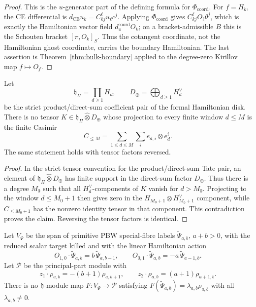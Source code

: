 \begin{proof}
  This is the \(u\)-generator part of the defining formula for
  \(\Phi_{\mathrm{coord}}\).
  For \(f=H_k\), the CE differential is
  \(d_{\mathrm{CE}}u_k=C^\ell_{kj}u_\ell c^j\).  Applying
  \(\Phi_{\mathrm{coord}}\) gives
  \(C^\ell_{kj}O_\ell\theta^j\), which is exactly the Hamiltonian vector
	  field \(d_\pi^{\mathrm{coord}}O_k\); on a bracket-admissible \(B\) this
	  is the Schouten bracket \([\pi,O_k]_S\).  Thus the cotangent coordinate, not the
  Hamiltonian ghost coordinate, carries the boundary Hamiltonian.  The
  last assertion is Theorem~\ref{thm:bulk-boundary} applied to the
  degree-zero Kirillov map \(f\mapsto O_f\).
\end{proof}

\begin{thm}\label{thm:lane-strict-casimir-obstruction}
  Let
  \[
    \mathfrak h_\Pi=\prod_{d\geq1}H_d,\qquad
    D_\oplus=\bigoplus_{d\geq1}H_d^\vee
  \]
  be the strict product/direct-sum coefficient pair of the formal
  Hamiltonian disk.  There is no tensor
  \(K\in\mathfrak h_\Pi\widehat\otimes D_\oplus\) whose projection to
  every finite window \(d\leq M\) is the finite Casimir
  \[
    C_{\leq M}=\sum_{1\leq d\leq M}\sum_i e_{d,i}\otimes e^i_{d}.
  \]
  The same statement holds with tensor factors reversed.
\end{thm}

\begin{proof}
  In the strict tensor convention for the product/direct-sum Tate pair,
  an element of \(\mathfrak h_\Pi\widehat\otimes D_\oplus\) has finite
  support in the direct-sum factor \(D_\oplus\).  Thus there is a degree
  \(M_0\) such that all \(H_d^\vee\)-components of \(K\) vanish for
  \(d>M_0\).  Projecting to the window \(d\leq M_0+1\) then gives zero in
  the \(H_{M_0+1}\otimes H_{M_0+1}^\vee\) component, while
  \(C_{\leq M_0+1}\) has the nonzero identity tensor in that component.
  This contradiction proves the claim.  Reversing the tensor factors is
  identical.
\end{proof}

\begin{thm}\label{thm:lane-one-psi-not-cotangent-current}
  Let \(V_\Psi\) be the span of primitive PBW special-fibre labels
  \(\widetilde\Psi_{a,b}\), \(a+b>0\), with the reduced scalar target
  killed and with the linear Hamiltonian action
  \[
    O_{1,0}\cdot\widetilde\Psi_{a,b}
      =b\,\widetilde\Psi_{a,b-1},\qquad
    O_{0,1}\cdot\widetilde\Psi_{a,b}
      =-a\,\widetilde\Psi_{a-1,b}.
  \]
  Let \(\mathcal P\) be the principal-part module with
  \[
    z_1\cdot\rho_{a,b}=-(b+1)\rho_{a,b+1},\qquad
    z_2\cdot\rho_{a,b}=(a+1)\rho_{a+1,b}.
  \]
  There is no \(\mathfrak h\)-module map
  \(F\colon V_\Psi\to\mathcal P\) satisfying
  \(F(\widetilde\Psi_{a,b})=\lambda_{a,b}\rho_{a,b}\) with all
  \(\lambda_{a,b}\neq0\).
\end{thm}

